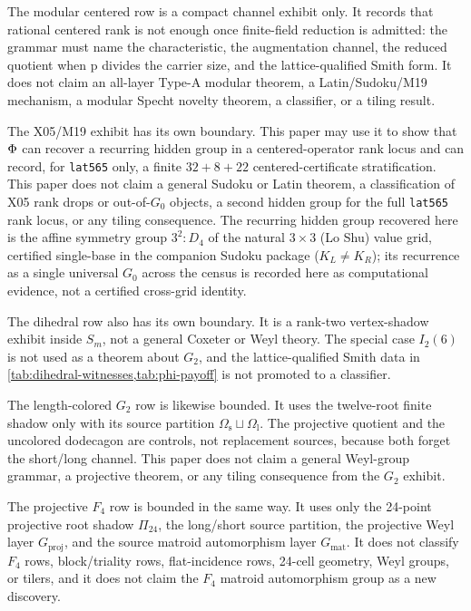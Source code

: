 The modular centered row is a compact channel exhibit only.  It records that rational centered rank is not enough once finite-field reduction is admitted: the grammar must name the characteristic, the augmentation channel, the reduced quotient when p divides the carrier size, and the lattice-qualified Smith form.  It does not claim an all-layer Type-A modular theorem, a Latin/Sudoku/M19 mechanism, a modular Specht novelty theorem, a classifier, or a tiling result.

The X05/M19 exhibit has its own boundary.  This paper may use it to show that \(\Phi\) can recover a recurring hidden group in a centered-operator rank locus and can record, for \texttt{lat565} only, a finite \(32+8+22\) centered-certificate stratification.  This paper does not claim a general Sudoku or Latin theorem, a classification of X05 rank drops or out-of-\(G_0\) objects, a second hidden group for the full \texttt{lat565} rank locus, or any tiling consequence.  The recurring hidden group recovered here is the affine symmetry group \(3^2{:}D_4\) of the natural \(3\times 3\) (Lo Shu) value grid, certified single-base in the companion Sudoku package (\(K_L\neq K_R\)); its recurrence as a single universal \(G_0\) across the census is recorded here as computational evidence, not a certified cross-grid identity.

The dihedral row also has its own boundary.  It is a rank-two vertex-shadow exhibit inside \(S_m\), not a general Coxeter or Weyl theory.  The special case \(I_2(6)\) is not used as a theorem about \(G_2\), and the lattice-qualified Smith data in \cref{tab:dihedral-witnesses,tab:phi-payoff} is not promoted to a classifier.

The length-colored \(G_2\) row is likewise bounded.  It uses the twelve-root finite shadow only with its source partition \(\Omega_{\mathrm{s}}\sqcup\Omega_{\mathrm{l}}\).  The projective quotient and the uncolored dodecagon are controls, not replacement sources, because both forget the short/long channel.  This paper does not claim a general Weyl-group grammar, a projective theorem, or any tiling consequence from the \(G_2\) exhibit.

The projective \(F_4\) row is bounded in the same way.  It uses only the 24-point projective root shadow \(\Pi_{24}\), the long/short source partition, the projective Weyl layer \(G_{\mathrm{proj}}\), and the source matroid automorphism layer \(G_{\mathrm{mat}}\).  It does not classify \(F_4\) rows, block/triality rows, flat-incidence rows, 24-cell geometry, Weyl groups, or tilers, and it does not claim the \(F_4\) matroid automorphism group as a new discovery.


